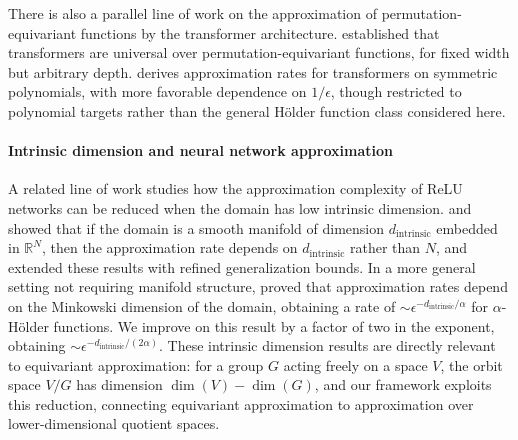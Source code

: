 \documentclass[twoside,11pt]{article}
\newcommand{\RR}{\mathbb{R}}
\newcommand{\dint}{d_{\text{intrinsic}}}
\begin{document}
There is also a parallel line of work on the approximation of permutation-equivariant functions by the transformer architecture. \citet{yun2020are} established that transformers are universal over permutation-equivariant functions, for fixed width but arbitrary depth. \citet{TakeshitaImaizumi2025} derives approximation rates for transformers on symmetric polynomials, with more favorable dependence on $1/\epsilon$, though restricted to polynomial targets rather than the general H\"older function class considered here.

\paragraph{Intrinsic dimension and neural network approximation}
A related line of work studies how the approximation complexity of ReLU networks can be reduced when the domain has low intrinsic dimension. \citet{shaham2018provable} and \citet{chen2019efficient} showed that if the domain is a smooth manifold of dimension $\dint$ embedded in $\RR^N$, then the approximation rate depends on $\dint$ rather than $N$, and \citet{labate2024low} extended these results with refined generalization bounds. In a more general setting not requiring manifold structure, \citet{nakada2020adaptive} proved that approximation rates depend on the Minkowski dimension of the domain, obtaining a rate of $\sim\epsilon^{-\dint/\alpha}$ for $\alpha$-H\"older functions. We improve on this result by a factor of two in the exponent, obtaining $\sim\epsilon^{-\dint/(2\alpha)}$. These intrinsic dimension results are directly relevant to equivariant approximation: for a group $G$ acting freely on a space $V$, the orbit space $V/G$ has dimension $\dim(V) - \dim(G)$, and our framework exploits this reduction, connecting equivariant approximation to approximation over lower-dimensional quotient spaces.
\end{document}
